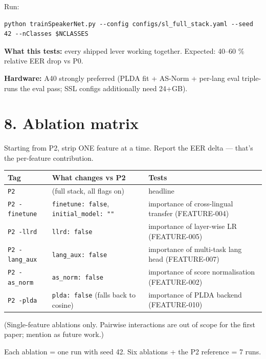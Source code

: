 \documentclass[10pt,a4paper]{article}
\renewcommand{\arraystretch}{1.15}
\begin{document}
Run:

\begin{Verbatim}[fontsize=\small,frame=single,framesep=4pt]
python trainSpeakerNet.py --config configs/sl_full_stack.yaml --seed 42 --nClasses $NCLASSES
\end{Verbatim}


\textbf{What this tests:} every shipped lever working together. Expected: 40--60 \% relative EER drop vs P0.

\textbf{Hardware:} A40 strongly preferred (PLDA fit + AS-Norm + per-lang eval triple-runs the eval pass; SSL configs additionally need 24+GB).

\section*{8. Ablation matrix}

Starting from P2, strip ONE feature at a time. Report the EER delta --- that's the per-feature contribution.

\begin{center}
\small
\renewcommand{\arraystretch}{1.25}
\begin{tabularx}{\textwidth}{|Y|Y|Y|}
\hline
Tag & What changes vs P2 & Tests \\
\hline
\texttt{P2} & (full stack, all flags on) & headline \\
\hline
\texttt{P2 -finetune} & \texttt{finetune: false}, \texttt{initial\_model: ""} & importance of cross-lingual transfer (FEATURE-004) \\
\hline
\texttt{P2 -llrd} & \texttt{llrd: false} & importance of layer-wise LR (FEATURE-005) \\
\hline
\texttt{P2 -lang\_aux} & \texttt{lang\_aux: false} & importance of multi-task lang head (FEATURE-007) \\
\hline
\texttt{P2 -as\_norm} & \texttt{as\_norm: false} & importance of score normalisation (FEATURE-002) \\
\hline
\texttt{P2 -plda} & \texttt{plda: false} (falls back to cosine) & importance of PLDA backend (FEATURE-010) \\
\hline
\end{tabularx}
\end{center}

(Single-feature ablations only. Pairwise interactions are out of scope for the first paper; mention as future work.)

Each ablation = one run with seed 42. Six ablations + the P2 reference = 7 runs.
\end{document}
